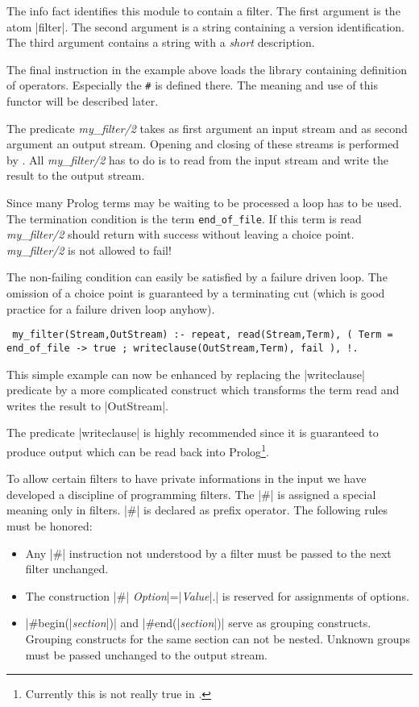 The info fact identifies this module to contain a filter. The first argument
is the atom |filter|. The second argument is a string containing a version
identification. The third argument contains a string with a {\em short}\/
description. 

The final instruction in the example above loads the library containing
definition of operators.  Especially the \verb|#| is defined there. The
meaning and use of this functor will be described later.

The predicate {\em my\_filter/2} takes as first argument an input stream and
as second argument an output stream. Opening and closing of these streams is
performed by \ProTop. All {\em my\_filter/2} has to do is to read from the
input stream and write the result to the output stream.

Since many Prolog terms may be waiting to be processed a loop has to be used.
The termination condition is the term \verb|end_of_file|. If this term is read
{\em my\_filter/2} should return with success without leaving a choice point.
{\em my\_filter/2} is not allowed to fail!

The non-failing condition can easily be satisfied by a failure driven loop. The
omission of a choice point is guaranteed by a terminating cut (which is good
practice for a failure driven loop anyhow).

\begin{BoxedSample}\raggedright\tt\obeyspaces
my\_filter(Stream,OutStream) :-
        repeat,
        read(Stream,Term),
        ( Term = end\_of\_file ->
            true
        ;   writeclause(OutStream,Term),
            fail
        ),
        !.
\end{BoxedSample}

This simple example can now be enhanced by replacing the |writeclause|
predicate by a more complicated construct which transforms the term read and
writes the result to |OutStream|.

The predicate |writeclause| is highly recommended since it is guaranteed to
produce output which can be read back into Prolog\footnote{Currently this is
not really true in \eclipse.}.

To allow certain filters to have private informations in the input we have
developed a discipline of programming filters. The |#| is assigned a special
meaning only in filters. |#| is declared as prefix operator.  The following
rules must be honored:

\begin{itemize}
  \item Any |#| instruction not understood by a filter must be passed
  to the next filter unchanged.

  \item The construction |#| {\em Option}|=|{\em Value}|.| is reserved for
  assignments of options.

  \item |#begin(|{\em section}|)| and |#end(|{\em section}|)| serve as
  grouping constructs. Grouping constructs for the same section can not be
  nested. Unknown groups must be passed unchanged to the output stream.
\end{itemize}





